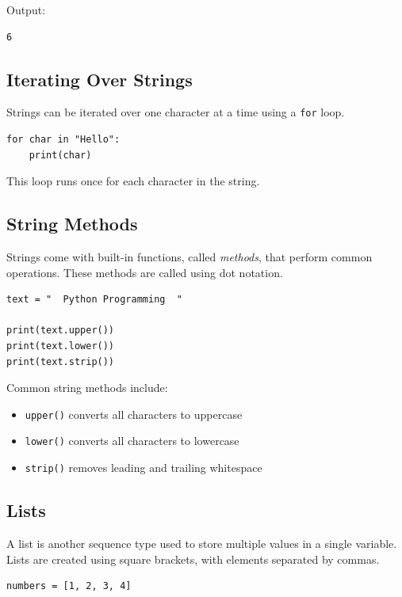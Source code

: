 Output:
\begin{verbatim}
6
\end{verbatim}

\subsection{Iterating Over Strings}
Strings can be iterated over one character at a time using a \texttt{for} loop.

\begin{verbatim}
for char in "Hello":
    print(char)
\end{verbatim}

This loop runs once for each character in the string.

\subsection{String Methods}
Strings come with built-in functions, called \emph{methods}, that perform common
operations. These methods are called using dot notation.

\begin{verbatim}
text = "  Python Programming  "

print(text.upper())
print(text.lower())
print(text.strip())
\end{verbatim}

Common string methods include:
\begin{itemize}
    \item \texttt{upper()} converts all characters to uppercase
    \item \texttt{lower()} converts all characters to lowercase
    \item \texttt{strip()} removes leading and trailing whitespace
\end{itemize}

\subsection{Lists}

A list is another sequence type used to store multiple values in a single
variable. Lists are created using square brackets, with elements separated by
commas.

\begin{verbatim}
numbers = [1, 2, 3, 4]
\end{verbatim}

